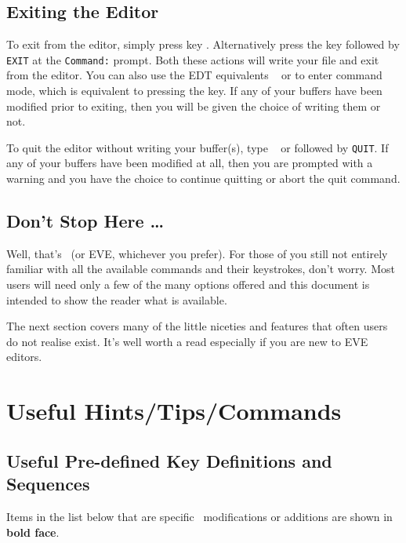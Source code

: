 \subsection{Exiting the Editor}

To exit from the editor, simply press key  . Alternatively press
the  key followed by {\tt EXIT} at the {\tt Command:} prompt. Both
these actions will write your file and exit from the editor. You can also use
the EDT equivalents \gold\  or   to enter
command mode, which is equivalent to pressing the  key. If any of
your buffers have been modified prior to exiting, then you will be given the
choice of writing them or not.

To quit the editor without writing your buffer(s), type \gold\  or
 followed  by {\tt QUIT}. If any of your buffers have been
modified at all, then you are prompted with a warning and you have the choice
to continue quitting or abort the quit command.

\subsection{Don't Stop Here \ldots}

Well, that's \STEve\ (or EVE, whichever you prefer). For those of
you still not entirely familiar with all the available commands and their
keystrokes, don't worry. Most users will need only a few of the many options
offered and this document is intended to show the reader what is available.

The next section covers many of the little niceties and features that often
users do not realise exist. It's well worth a read especially if you are new
to EVE editors.

\section{Useful Hints/Tips/Commands}

\subsection{Useful Pre-defined Key Definitions and Sequences}

Items in the list below that are specific \STEve\ modifications or additions
are shown in {\bf bold face}.

